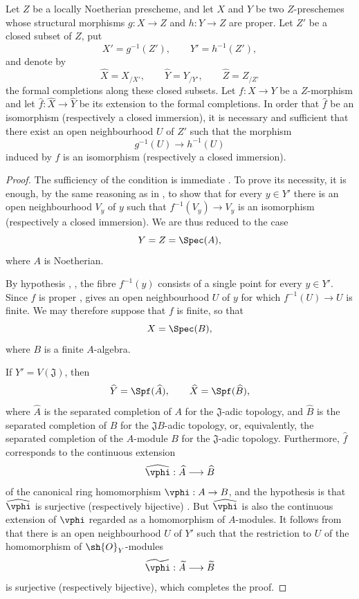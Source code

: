 \begin{proposition}[4.6.8]
\label{III.4.6.8}
Let $Z$ be a locally Noetherian prescheme, and let $X$ and $Y$ be
two $Z$-preschemes whose structural morphisms
$g:X\to Z$ and $h:Y\to Z$ are proper.  Let $Z'$ be a closed subset
of $Z$, put
\[
  X'=g^{-1}(Z'),\qquad Y'=h^{-1}(Z'),
\]
and denote by
\[
  \widehat X=X_{/X'},\qquad
  \widehat Y=Y_{/Y'},\qquad
  \widehat Z=Z_{/Z'}
\]
the formal completions along these closed subsets.  Let $f:X\to Y$
be a $Z$-morphism and let
$\widehat f:\widehat X\to\widehat Y$ be its extension to the formal
completions.  In order that $\widehat f$ be an isomorphism
(respectively a closed immersion), it is necessary and sufficient
that there exist an open neighbourhood $U$ of $Z'$ such that the
morphism
\[
  g^{-1}(U)\longrightarrow h^{-1}(U)
\]
induced by $f$ is an isomorphism (respectively a closed immersion).
\end{proposition}

\begin{proof}
The sufficiency of the condition is immediate
.  To prove its necessity, it is enough, by the
same reasoning as in , to show that for every
$y\in Y'$ there is an open neighbourhood $V_y$ of $y$ such that
$f^{-1}(V_y)\to V_y$ is an isomorphism (respectively a closed
immersion).  We are thus reduced to the case
\[
  Y=Z=\Spec(A),
\]
where $A$ is Noetherian.

By hypothesis , , the fibre
$f^{-1}(y)$ consists of a single point for every $y\in Y'$.  Since
$f$ is proper ,  gives an open
neighbourhood $U$ of $y$ for which $f^{-1}(U)\to U$ is finite.  We
may therefore suppose that $f$ is finite, so that
\[
  X=\Spec(B),
\]
where $B$ is a finite $A$-algebra.

If $Y'=V(\mathfrak J)$, then
\[
  \widehat Y=\Spf(\widehat A),
  \qquad
  \widehat X=\Spf(\widehat B),
\]
where $\widehat A$ is the separated completion of $A$ for the
$\mathfrak J$-adic topology, and $\widehat B$ is the separated
completion of $B$ for the $\mathfrak JB$-adic topology, or,
equivalently, the separated completion of the $A$-module $B$ for
the $\mathfrak J$-adic topology.  Furthermore, $\widehat f$
corresponds to the continuous extension
\[
  \widehat{\vphi}:\widehat A\longrightarrow\widehat B
\]
of the canonical ring homomorphism $\vphi:A\to B$, and the
hypothesis is that $\widehat{\vphi}$ is surjective (respectively
bijective) .  But $\widehat{\vphi}$ is also the
continuous extension of $\vphi$ regarded as a homomorphism of
$A$-modules.  It follows from  that there is an
open neighbourhood $U$ of $Y'$ such that the restriction to $U$ of
the homomorphism of $\sh{O}_Y$-modules
\[
  \widetilde{\vphi}:\widetilde A\longrightarrow\widetilde B
\]
is surjective (respectively bijective), which completes the proof.
\end{proof}


